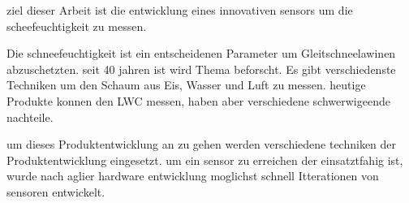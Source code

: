 ziel dieser Arbeit ist die entwicklung eines innovativen sensors um die scheefeuchtigkeit zu messen.

Die schneefeuchtigkeit ist ein entscheidenen Parameter um Gleitschneelawinen abzuschetzten. seit 40 jahren ist wird Thema beforscht. Es gibt verschiedenste Techniken um den Schaum aus Eis, Wasser und Luft zu messen. heutige Produkte konnen den LWC messen, haben aber verschiedene schwerwigeende nachteile.

um dieses Produktentwicklung an zu gehen werden verschiedene techniken der Produktentwicklung eingesetzt. um ein sensor zu erreichen der einsatztfahig ist, wurde nach aglier hardware entwicklung moglichst schnell Itterationen von sensoren entwickelt.
